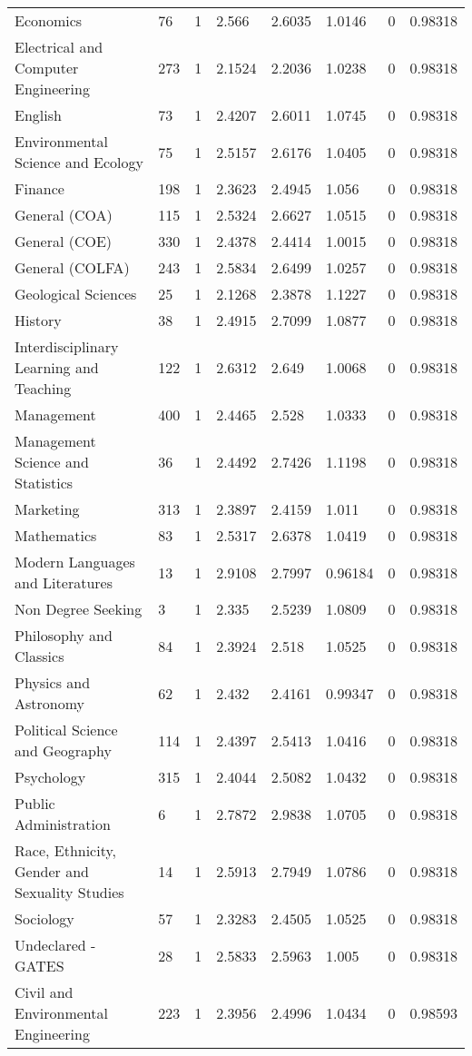 \begin{sidewaystable}
{\begin{longtable}{llllllll}
Economics & 76 & 1 & 2.566 & 2.6035 & 1.0146 & 0 & 0.98318 \\ 
Electrical and Computer Engineering & 273 & 1 & 2.1524 & 2.2036 & 1.0238 & 0 & 0.98318 \\ 
English & 73 & 1 & 2.4207 & 2.6011 & 1.0745 & 0 & 0.98318 \\ 
Environmental Science and Ecology & 75 & 1 & 2.5157 & 2.6176 & 1.0405 & 0 & 0.98318 \\ 
Finance & 198 & 1 & 2.3623 & 2.4945 & 1.056 & 0 & 0.98318 \\ 
General (COA) & 115 & 1 & 2.5324 & 2.6627 & 1.0515 & 0 & 0.98318 \\ 
General (COE) & 330 & 1 & 2.4378 & 2.4414 & 1.0015 & 0 & 0.98318 \\ 
General (COLFA) & 243 & 1 & 2.5834 & 2.6499 & 1.0257 & 0 & 0.98318 \\ 
Geological Sciences & 25 & 1 & 2.1268 & 2.3878 & 1.1227 & 0 & 0.98318 \\ 
History & 38 & 1 & 2.4915 & 2.7099 & 1.0877 & 0 & 0.98318 \\ 
Interdisciplinary Learning and Teaching & 122 & 1 & 2.6312 & 2.649 & 1.0068 & 0 & 0.98318 \\ 
Management & 400 & 1 & 2.4465 & 2.528 & 1.0333 & 0 & 0.98318 \\ 
Management Science and Statistics & 36 & 1 & 2.4492 & 2.7426 & 1.1198 & 0 & 0.98318 \\ 
Marketing & 313 & 1 & 2.3897 & 2.4159 & 1.011 & 0 & 0.98318 \\ 
Mathematics & 83 & 1 & 2.5317 & 2.6378 & 1.0419 & 0 & 0.98318 \\ 
Modern Languages and Literatures & 13 & 1 & 2.9108 & 2.7997 & 0.96184 & 0 & 0.98318 \\ 
Non Degree Seeking & 3 & 1 & 2.335 & 2.5239 & 1.0809 & 0 & 0.98318 \\ 
Philosophy and Classics & 84 & 1 & 2.3924 & 2.518 & 1.0525 & 0 & 0.98318 \\ 
Physics and Astronomy & 62 & 1 & 2.432 & 2.4161 & 0.99347 & 0 & 0.98318 \\ 
Political Science and Geography & 114 & 1 & 2.4397 & 2.5413 & 1.0416 & 0 & 0.98318 \\ 
Psychology & 315 & 1 & 2.4044 & 2.5082 & 1.0432 & 0 & 0.98318 \\ 
Public Administration & 6 & 1 & 2.7872 & 2.9838 & 1.0705 & 0 & 0.98318 \\ 
Race, Ethnicity, Gender and Sexuality Studies & 14 & 1 & 2.5913 & 2.7949 & 1.0786 & 0 & 0.98318 \\ 
Sociology & 57 & 1 & 2.3283 & 2.4505 & 1.0525 & 0 & 0.98318 \\ 
Undeclared - GATES & 28 & 1 & 2.5833 & 2.5963 & 1.005 & 0 & 0.98318 \\ 
Civil and Environmental Engineering & 223 & 1 & 2.3956 & 2.4996 & 1.0434 & 0 & 0.98593 \\ 
\hline 
\end{longtable}}
\end{sidewaystable}


